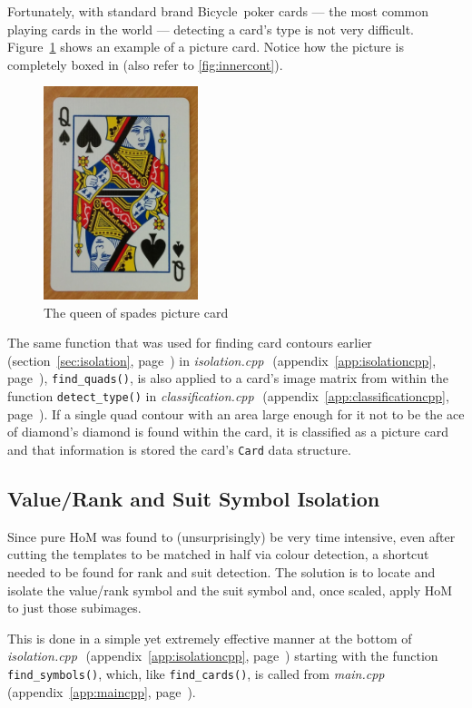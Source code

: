 \documentclass[a4paper,12pt,notitlepage]{article}
\newcommand{\source}[2]{\emph{#1 } (appendix~\ref{#2}, page~\pageref{#2})}
\newcommand{\secref}[1]{(section~\ref{#1}, page~\pageref{#1})}
\newcommand{\code}[1]{\lstinline[basicstyle=\ttfamily,breakautoindent=false,postbreak={}]|#1|}
\begin{document}
		Fortunately, with standard brand Bicycle\textregistered~poker cards --- the most common playing cards in the world --- detecting a card's type is not very difficult. Figure~\ref{fig:picture} shows an example of a picture card. Notice how the picture is completely boxed in (also refer to \ref{fig:innercont}).

		\begin{figure}[H]
			\centering
			\includegraphics[width=0.4\textwidth]{picture}
			\caption{The queen of spades picture card}
			\label{fig:picture}
		\end{figure}

		The same function that was used for finding card contours earlier \secref{sec:isolation} in \source{isolation.cpp}{app:isolationcpp}, \code{find_quads()}, is also applied to a card's image matrix from within the function \code{detect_type()} in \source{classification.cpp}{app:classificationcpp}. If a single quad contour with an area large enough for it not to be the ace of diamond's diamond is found within the card, it is classified as a picture card and that information is stored the card's \code{Card} data structure.
	\subsection{Value/Rank and Suit Symbol Isolation}
		Since pure HoM was found to (unsurprisingly) be very time intensive, even after cutting the templates to be matched in half via colour detection, a shortcut needed to be found for rank and suit detection. The solution is to locate and isolate the value/rank symbol and the suit symbol and, once scaled, apply HoM to just those subimages.

		This is done in a simple yet extremely effective manner at the bottom of \source{isolation.cpp}{app:isolationcpp} starting with the function \code{find_symbols()}, which, like \code{find_cards()}, is called from \source{main.cpp}{app:maincpp}.
\end{document}
